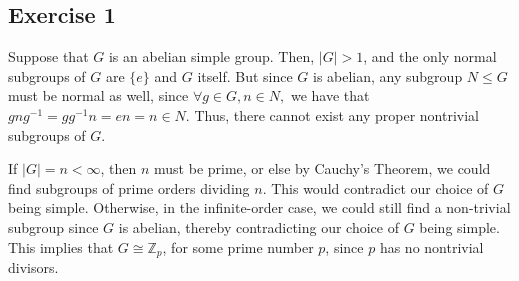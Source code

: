 \subsection*{Exercise 1}
Suppose that $G$ is an abelian simple group. Then, $|G| > 1$, and the only normal subgroups of $G$ are $\{e\}$ and $G$ itself. But since $G$ is abelian, any subgroup $N \le G$ must be normal as well, since $\forall g \in G, n \in N,$ we have that $gng^{-1} = gg^{-1}n = en = n \in N$. Thus, there cannot exist any proper nontrivial subgroups of $G$.

If $|G| = n < \infty$, then $n$ must be prime, or else by Cauchy's Theorem, we could find subgroups of prime orders dividing $n$. This would contradict our choice of $G$ being simple. Otherwise, in the infinite-order case, we could still find a non-trivial subgroup since $G$ is abelian, thereby contradicting our choice of $G$ being simple. This implies that $G \cong \mathbb{Z}_p$, for some prime number $p$, since $p$ has no nontrivial divisors.